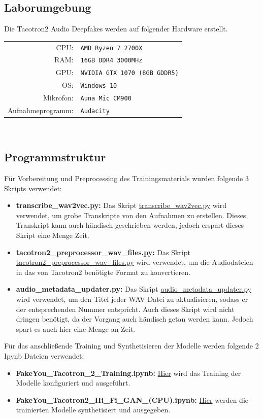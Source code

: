 \subsection{Laborumgebung}
Die Tacotron2 Audio Deepfakes werden auf folgender Hardware erstellt.\\[0.5cm]
\begin{tabular}{rl}
    CPU:& \texttt{AMD Ryzen 7 2700X}\\
    RAM:& \texttt{16GB DDR4 3000MHz}\\
    GPU:& \texttt{NVIDIA GTX 1070 (8GB GDDR5)}\\
    OS:& \texttt{Windows 10}\\
    Mikrofon:& \texttt{Auna Mic CM900}\\
    Aufnahmeprogramm:& \texttt{Audacity}
\end{tabular}\\[0.5cm]
\subsection{Programmstruktur}
Für Vorbereitung und Preprocessing des Trainingsmaterials wurden folgende 3 Skripts verwendet:
\begin{itemize}
    \item \textbf{transcribe\_wav2vec.py:} Das Skript \href{https://github.com/rasmurtech/Tacotron2-Wav2Vec-Transcription}{transcribe\_wav2vec.py} wird verwendet, um grobe Transkripte von den Aufnahmen zu erstellen. Dieses Transkript kann auch händisch geschrieben werden, jedoch erspart dieses Skript eine Menge Zeit.
    \item \textbf{tacotron2\_preprocessor\_wav\_files.py:} Das Skript \href{https://github.com/rasmurtech/Tacotron-2-Audio-Preprocessor}{tacotron2\_preprocessor\_wav\_files.py} wird verwendet, um die Audiodateien in das von Tacotron2 benötigte Format zu konvertieren.
    \item \textbf{audio\_metadata\_updater.py:} Das Skript \href{https://github.com/rasmurtech/Audio-Metadata-Updater}{audio\_metadata\_updater.py} wird verwendet, um den Titel jeder WAV Datei zu aktualisieren, sodass er der entsprechenden Nummer entspricht. Auch dieses Skript wird nicht dringen benötigt, da der Vorgang auch händisch getan werden kann. Jedoch spart es auch hier eine Menge an Zeit.
\end{itemize}
Für das anschließende Training und Synthetisieren der Modelle werden folgende 2 Ipynb Dateien verwendet:
\begin{itemize}
    \item \textbf{FakeYou\_Tacotron\_2\_Training.ipynb:} \href{https://colab.research.google.com/github/justinjohn0306/FakeYou-Tacotron2-Notebook/blob/dev/FakeYou_Tacotron_2_Training.ipynb}{Hier} wird das Training der Modelle konfiguriert und ausgeführt.
    \item \textbf{FakeYou\_Tacotron2\_Hi\_Fi\_GAN\_(CPU).ipynb:} \href{https://colab.research.google.com/github/justinjohn0306/FakeYou-Tacotron2-Notebook/blob/main/FakeYou_Tacotron2_Hi_Fi_GAN_(CPU).ipynb}{Hier} werden die trainierten Modelle synthetisiert und ausgegeben.
\end{itemize}
